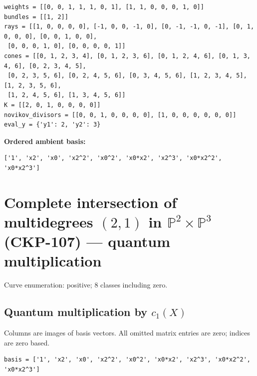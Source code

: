 \documentclass[10pt,a4paper]{article}
\begin{document}
\begin{lstlisting}
weights = [[0, 0, 1, 1, 1, 0, 1], [1, 1, 0, 0, 0, 1, 0]]
bundles = [[1, 2]]
rays = [[1, 0, 0, 0, 0], [-1, 0, 0, -1, 0], [0, -1, -1, 0, -1], [0, 1, 0, 0, 0], [0, 0, 1, 0, 0],
 [0, 0, 0, 1, 0], [0, 0, 0, 0, 1]]
cones = [[0, 1, 2, 3, 4], [0, 1, 2, 3, 6], [0, 1, 2, 4, 6], [0, 1, 3, 4, 6], [0, 2, 3, 4, 5],
 [0, 2, 3, 5, 6], [0, 2, 4, 5, 6], [0, 3, 4, 5, 6], [1, 2, 3, 4, 5], [1, 2, 3, 5, 6],
 [1, 2, 4, 5, 6], [1, 3, 4, 5, 6]]
K = [[2, 0, 1, 0, 0, 0, 0]]
novikov_divisors = [[0, 0, 1, 0, 0, 0, 0], [1, 0, 0, 0, 0, 0, 0]]
eval_y = {'y1': 2, 'y2': 3}
\end{lstlisting}

\textbf{Ordered ambient basis:}
\begin{lstlisting}
['1', 'x2', 'x0', 'x2^2', 'x0^2', 'x0*x2', 'x2^3', 'x0*x2^2', 'x0*x2^3']
\end{lstlisting}

\clearpage\section*{Complete intersection of multidegrees $(2,1)$ in $\mathbb P^{2}\times \mathbb P^{3}$ (CKP-107) --- quantum multiplication}

Curve enumeration: positive; 8 classes including zero.
\subsection*{Quantum multiplication by $c_1(X)$}
Columns are images of basis vectors. All omitted matrix entries are zero; indices are zero based.

\begin{lstlisting}
basis = ['1', 'x2', 'x0', 'x2^2', 'x0^2', 'x0*x2', 'x2^3', 'x0*x2^2', 'x0*x2^3']
\end{lstlisting}
\end{document}
